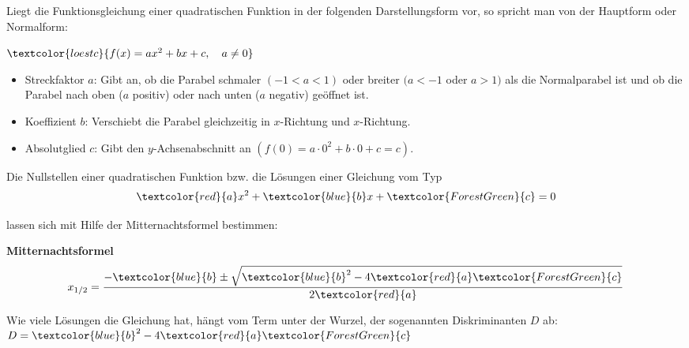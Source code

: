 Liegt die Funktionsgleichung einer quadratischen Funktion in der folgenden Darstellungsform vor, so spricht man von der Hauptform oder Normalform:
\begin{tcolorbox}\centering
	\(\textcolor{loestc}{f(x)=ax^2+bx+c, \quad a\neq 0}\)
\end{tcolorbox}
\begin{itemize}
	\item Streckfaktor \(a\): \textcolor{loes}{Gibt an, ob die Parabel schmaler \(\left(-1<a<1\right)\) oder breiter  \((a<-1\) oder \(a>1)\) als die Normalparabel ist und ob die Parabel nach oben (\(a\) positiv) oder nach unten (\(a\) negativ) geöffnet ist.}
	
	\bigskip
	
	\item Koeffizient \(b\): \textcolor{loes}{Verschiebt die Parabel gleichzeitig in \(x\)-Richtung und \(x\)-Richtung.}
	
	\bigskip
	
	\item Absolutglied \(c\): \textcolor{loes}{Gibt den \(y\)-Achsenabschnitt an \(\left(f(0)=a\cdot 0^2+b\cdot 0+c=c\right)\).}
	
	\bigskip
	
\end{itemize}
Die Nullstellen einer quadratischen Funktion bzw. die Lösungen einer Gleichung vom Typ
\[{\textcolor{red}{a}x^2+\textcolor{blue}{b}x+\textcolor{ForestGreen}{c}=0}\]%

lassen sich mit Hilfe der Mitternachtsformel bestimmen:
\begin{tcolorbox}
\textbf{Mitternachtsformel}
\[x_{1/2}=\frac{-\textcolor{blue}{b}\pm\sqrt{\textcolor{blue}{b}^2-4 \textcolor{red}{a}  \textcolor{ForestGreen}{c}}}{2 \textcolor{red}{a}}\]%
\end{tcolorbox}

Wie viele Lösungen die Gleichung hat, hängt vom Term unter der Wurzel, der sogenannten Diskriminanten \(D\) ab:
\(D=\textcolor{blue}{b}^2-4 \textcolor{red}{a}  \textcolor{ForestGreen}{c}\)

\bigskip

